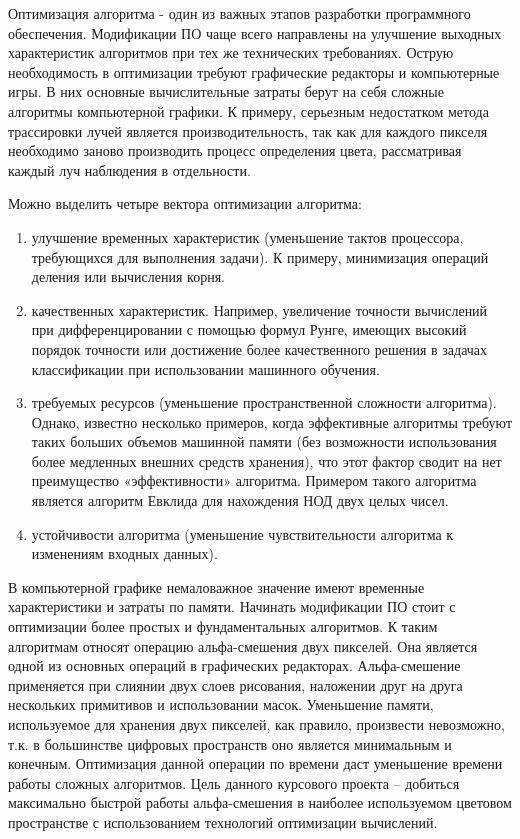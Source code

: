 \Introduction

 Оптимизация алгоритма - один из важных этапов разработки программного обеспечения. Модификации ПО чаще всего направлены на улучшение выходных характеристик алгоритмов при тех же технических требованиях. Острую необходимость в оптимизации  требуют графические редакторы и компьютерные игры. В них основные вычислительные затраты берут на себя сложные алгоритмы компьютерной графики. К примеру, серьезным недостатком метода трассировки лучей является производительность, так как для каждого пикселя необходимо заново производить процесс определения цвета, рассматривая каждый луч наблюдения в отдельности.
 
Можно выделить четыре вектора оптимизации алгоритма: 
\begin{enumerate}
\item улучшение временных характеристик (уменьшение тактов процессора, требующихся для выполнения задачи). К примеру, минимизация операций деления или вычисления корня. 
\item качественных характеристик. Например, увеличение точности вычислений при дифференцировании с помощью формул Рунге, имеющих высокий порядок точности или достижение более качественного решения в задачах классификации  при использовании машинного обучения.
\item требуемых ресурсов (уменьшение пространственной сложности алгоритма). Однако, известно несколько примеров, когда эффективные алгоритмы требуют таких больших объемов машинной памяти (без возможности использования более медленных внешних средств хранения), что этот фактор сводит на нет преимущество «эффективности» алгоритма. Примером такого алгоритма является алгоритм Евклида для нахождения НОД двух целых чисел.
\item устойчивости алгоритма (уменьшение чувствительности алгоритма к изменениям входных данных).
\end{enumerate}

В компьютерной графике немаловажное значение имеют временные характеристики и затраты по памяти. Начинать модификации ПО стоит с оптимизации более простых и фундаментальных алгоритмов. К таким алгоритмам относят операцию альфа-смешения двух пикселей. Она является одной из основных операций в графических редакторах. Альфа-смешение применяется при слиянии двух слоев рисования, наложении друг на друга нескольких  примитивов и использовании масок. Уменьшение памяти, используемое для хранения двух пикселей, как правило, произвести невозможно, т.к. в большинстве цифровых пространств оно является минимальным и конечным. Оптимизация данной операции по времени даст уменьшение времени работы сложных алгоритмов.  Цель данного курсового проекта -- добиться максимально быстрой работы альфа-смешения в наиболее используемом
цветовом пространстве с использованием технологий оптимизации вычислений.
 
  
 
 
 
